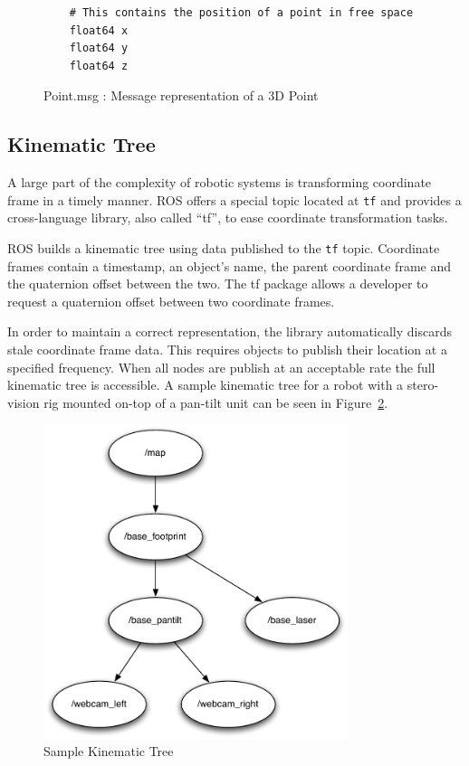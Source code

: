 \begin{figure}[ht]
\makebox[\textwidth]{\hrulefill}
\begin{verbatim}
	# This contains the position of a point in free space
	float64 x
	float64 y
	float64 z
\end{verbatim}
\makebox[\textwidth]{\hrulefill}
\caption{Point.msg : Message representation of a 3D Point\label{fig:point}}
\end{figure}

\subsection{Kinematic Tree}
A large part of the complexity of robotic systems is transforming coordinate frame in a timely manner. ROS offers a special topic located at \verb!tf! and provides a cross-language library, also called ``tf'', to ease coordinate transformation tasks.

ROS builds a kinematic tree using data published to the \verb!tf! topic. Coordinate frames contain a timestamp, an object's name, the parent coordinate frame and the quaternion offset between the two. The tf package allows a developer to request a quaternion offset between two coordinate frames. 

In order to maintain a correct representation, the library automatically discards stale coordinate frame data. This requires objects to publish their location at a specified frequency. When all nodes are publish at an acceptable rate the full kinematic tree is accessible. A sample kinematic tree for a robot with a stero-vision rig mounted on-top of a pan-tilt unit can be seen in Figure~\ref{fig:tf-example}.

\begin{figure}[ht]
\begin{center}
\includegraphics[width=3.5in]{images/tf-example.pdf}
\caption{Sample Kinematic Tree\label{fig:tf-example}}
\end{center}
\end{figure}

